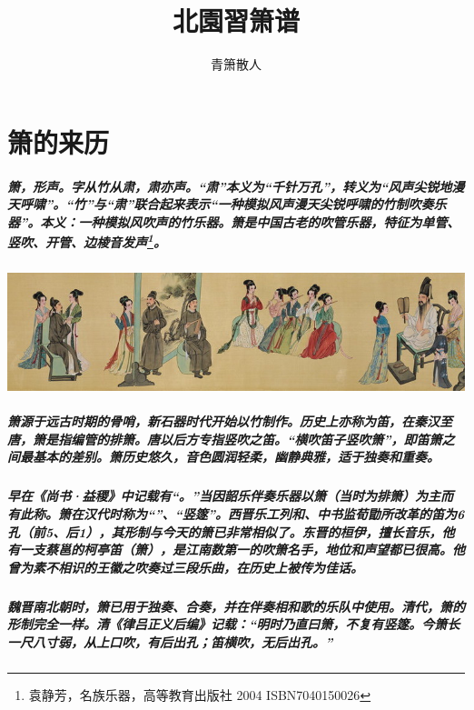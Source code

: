\documentclass[cn,pad,twocol]{elegantbook}
\title{北園習箫谱}
\author{青箫散人}
\date{\zhtoday}
\begin{document}
\maketitle
\frontmatter
\tableofcontents
\mainmatter

\chapter{箫的来历}
\paragraph*{箫，形声。字从竹从肃，肃亦声。“肃”本义为“千针万孔”，转义为“风声尖锐地漫天呼啸”。“竹”与“肃”联合起来表示“一种模拟风声漫天尖锐呼啸的竹制吹奏乐器”。本义：一种模拟风吹声的竹乐器。箫是中国古老的吹管乐器，特征为单管、竖吹、开管、边棱音发声\footnote{袁静芳，名族乐器，高等教育出版社 2004 ISBN7040150026}。}
\begin{center}
    \vfill
    \includegraphics[width=\textwidth]{cover8}
\end{center}

\paragraph*{箫源于远古时期的骨哨，新石器时代开始以竹制作。历史上亦称为笛，在秦汉至唐，箫是指编管的排箫。唐以后方专指竖吹之笛。“横吹笛子竖吹箫”，即笛箫之间最基本的差别。箫历史悠久，音色圆润轻柔，幽静典雅，适于独奏和重奏。} 
\paragraph*{早在《尚书·益稷》中记载有“。”当因韶乐伴奏乐器以箫（当时为排箫）为主而有此称。箫在汉代时称为“”、“竖篴”。西晋乐工列和、中书监荀勖所改革的笛为6 孔（前5、后1），其形制与今天的箫已非常相似了。东晋的桓伊，擅长音乐，他有一支蔡邕的柯亭笛（箫），是江南数第一的吹箫名手，地位和声望都已很高。他曾为素不相识的王徽之吹奏过三段乐曲，在历史上被传为佳话。}
\paragraph*{魏晋南北朝时，箫已用于独奏、合奏，并在伴奏相和歌的乐队中使用。清代，箫的形制完全一样。清《律吕正义后编》记载：“明时乃直曰箫，不复有竖篴。今箫长一尺八寸弱，从上口吹，有后出孔；笛横吹，无后出孔。”}
\end{document}
